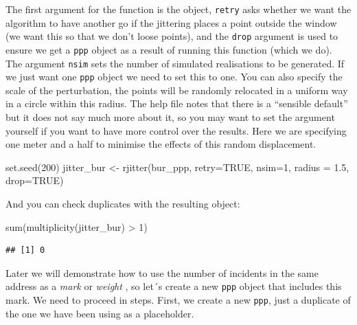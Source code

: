 \documentclass[
  krantz2]{krantz}
\makeatletter
\newenvironment{Shaded}{\begin{snugshade}}{\end{snugshade}}
\newcommand{\AttributeTok}[1]{\textcolor[rgb]{0.61,0.61,0.61}{#1}}
\newcommand{\ConstantTok}[1]{\textcolor[rgb]{0,0,0}{#1}}
\newcommand{\DecValTok}[1]{\textcolor[rgb]{0.06,0.06,0.06}{#1}}
\newcommand{\FloatTok}[1]{\textcolor[rgb]{0.06,0.06,0.06}{#1}}
\newcommand{\FunctionTok}[1]{\textcolor[rgb]{0,0,0}{#1}}
\newcommand{\NormalTok}[1]{#1}
\newcommand{\OtherTok}[1]{\textcolor[rgb]{0.37,0.37,0.37}{#1}}
\newcommand{\SpecialCharTok}[1]{\textcolor[rgb]{0,0,0}{#1}}
\newenvironment{kframe}{%
\medskip{}
\setlength{\fboxsep}{.8em}
 \def\at@end@of@kframe{}%
 \ifinner\ifhmode%
  \def\at@end@of@kframe{\end{minipage}}%
  \begin{minipage}{\columnwidth}%
 \fi\fi%
 \def\FrameCommand##1{\hskip\@totalleftmargin \hskip-\fboxsep
 \colorbox{shadecolor}{##1}\hskip-\fboxsep
     \hskip-\linewidth \hskip-\@totalleftmargin \hskip\columnwidth}%
 \MakeFramed {\advance\hsize-\width
   \@totalleftmargin\z@ \linewidth\hsize
   \@setminipage}}%
 {\par\unskip\endMakeFramed%
 \at@end@of@kframe}
\renewenvironment{Shaded}{\begin{kframe}}{\end{kframe}}
\makeatother
\begin{document}
The first argument for the function is the object, \texttt{retry} asks whether we want the algorithm to have another go if the jittering places a point outside the window (we want this so that we don't loose points), and the \texttt{drop} argument is used to ensure we get a \texttt{ppp} object as a result of running this function (which we do). The argument \texttt{nsim} sets the number of simulated realisations to be generated. If we just want one \texttt{ppp} object we need to set this to one. You can also specify the scale of the perturbation, the points will be randomly relocated in a uniform way in a circle within this radius. The help file notes that there is a ``sensible default'' but it does not say much more about it, so you may want to set the argument yourself if you want to have more control over the results. Here we are specifying one meter and a half to minimise the effects of this random displacement.

\begin{Shaded}
\begin{Highlighting}[]
\FunctionTok{set.seed}\NormalTok{(}\DecValTok{200}\NormalTok{)}
\NormalTok{jitter\_bur }\OtherTok{\textless{}{-}} \FunctionTok{rjitter}\NormalTok{(bur\_ppp, }\AttributeTok{retry=}\ConstantTok{TRUE}\NormalTok{, }\AttributeTok{nsim=}\DecValTok{1}\NormalTok{, }
                      \AttributeTok{radius =} \FloatTok{1.5}\NormalTok{, }\AttributeTok{drop=}\ConstantTok{TRUE}\NormalTok{)}
\end{Highlighting}
\end{Shaded}

And you can check duplicates with the resulting object:

\begin{Shaded}
\begin{Highlighting}[]
\FunctionTok{sum}\NormalTok{(}\FunctionTok{multiplicity}\NormalTok{(jitter\_bur) }\SpecialCharTok{\textgreater{}} \DecValTok{1}\NormalTok{)}
\end{Highlighting}
\end{Shaded}

\begin{verbatim}
## [1] 0
\end{verbatim}

Later we will demonstrate how to use the number of incidents in the same address as a \emph{mark} or \emph{weight} , so let´s create a new \texttt{ppp} object that includes this mark. We need to proceed in steps. First, we create a new \texttt{ppp}, just a duplicate of the one we have been using as a placeholder.
\end{document}
